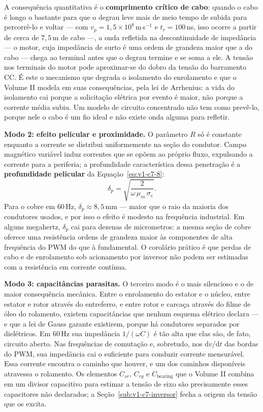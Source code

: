 \documentclass[12pt,a4paper]{article}
\numberwithin{equation}{section}
\numberwithin{table}{section}
\numberwithin{figure}{section}
\begin{document}
A consequência quantitativa é o \textbf{comprimento crítico de cabo}: quando o
cabo é longo o bastante para que o degrau leve mais de meio tempo de subida
para percorrê-lo e voltar --- com $v_p = 1{,}5\times10^{8}\,$m\,s$^{-1}$ e
$t_r = 100\,$ns, isso ocorre a partir de cerca de $7{,}5\,$m de cabo ---, a onda refletida na descontinuidade de impedância
--- o motor, cuja impedância de surto é uma ordem de grandeza maior que a do
cabo --- chega ao terminal antes que o degrau termine e se soma a ele. A
tensão nos terminais do motor pode aproximar-se do dobro da tensão do
barramento CC. É este o mecanismo que degrada o isolamento do enrolamento e que
o Volume II modela em suas consequências, pela lei de Arrhenius: a vida do
isolamento cai porque a solicitação elétrica por evento é maior, não porque a
corrente média subiu. Um modelo de circuito concentrado não tem como prevê-lo,
porque nele o cabo é um fio ideal e não existe onda alguma para refletir.

\textbf{Modo 2: efeito pelicular e proximidade.} O parâmetro $R$ só é constante
enquanto a corrente se distribui uniformemente na seção do condutor. Campo
magnético variável induz correntes que se opõem ao próprio fluxo, expulsando a
corrente para a periferia; a profundidade característica dessa penetração é a
\textbf{profundidade pelicular} da Equação~\eqref{eq:v1-c7-8}:
\begin{equation}\label{eq:v1-c7-8}
\delta_p = \sqrt{\frac{2}{\omega\,\mu_m\,\sigma_e}} .
\end{equation}
Para o cobre em $60\,$Hz, $\delta_p \approx 8{,}5\,$mm --- maior que o raio da
maioria dos condutores usados, e por isso o efeito é modesto na frequência
industrial. Em alguns megahertz, $\delta_p$ cai para dezenas de micrometros: a
mesma seção de cobre oferece uma resistência ordens de grandeza maior às
componentes de alta frequência do PWM do que à fundamental. O corolário
prático é que perdas de cabo e de enrolamento sob acionamento por inversor não
podem ser estimadas com a resistência em corrente contínua.

\textbf{Modo 3: capacitâncias parasitas.} O terceiro modo é o mais silencioso e
o de maior consequência mecânica. Entre o enrolamento do estator e o núcleo,
entre estator e rotor através do entreferro, e entre rotor e carcaça através do
filme de óleo do rolamento, existem capacitâncias que nenhum esquema elétrico
declara --- e que a lei de Gauss garante existirem, porque há condutores
separados por dielétricos. Em $60\,$Hz sua impedância $1/(\omega C)$ é tão alta
que elas são, de fato, circuito aberto. Nas frequências de comutação e,
sobretudo, nos $\mathrm{d}v/\mathrm{d}t$ das bordas do PWM, sua impedância cai
o suficiente para conduzir corrente mensurável. Essa corrente encontra o
caminho que houver, e um dos caminhos disponíveis atravessa o rolamento. Os
elementos $C_{sr}$, $C_{rg}$ e $C_{\text{bearing}}$ que o Volume II combina em
um divisor capacitivo para estimar a tensão de eixo são precisamente esses
capacitores não declarados; a Seção~\ref{sub:v1-c7-inversor} fecha a origem da
tensão que os excita.
\end{document}
